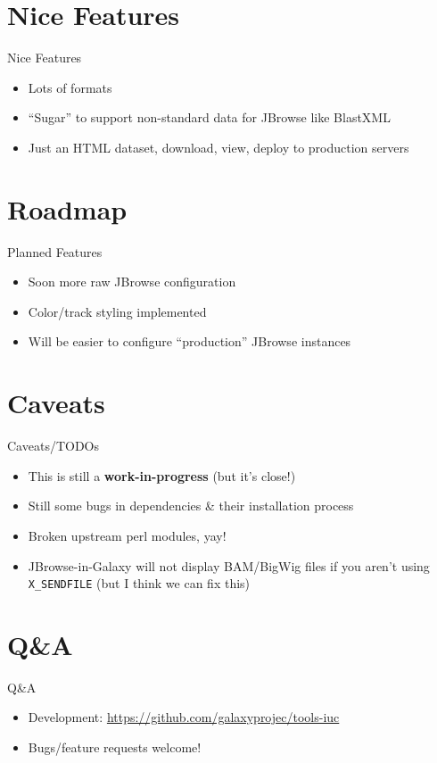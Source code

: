 \documentclass[12pt]{beamer} %
\begin{document}
\section{Nice Features}
\begin{frame}{Nice Features}
	\begin{itemize}
        \item Lots of formats
        \item ``Sugar'' to support non-standard data for JBrowse like BlastXML
        \item Just an HTML dataset, download, view, deploy to production servers
    \end{itemize}
\end{frame}

\section{Roadmap}
\begin{frame}{Planned Features}
	\begin{itemize}
        \item Soon more raw JBrowse configuration
        \item Color/track styling implemented
        \item Will be easier to configure ``production'' JBrowse instances
    \end{itemize}
\end{frame}

\section{Caveats}
\begin{frame}{Caveats/TODOs}
	\begin{itemize}
    	\item This is still a \textbf{work-in-progress} (but it's close!)
        \item Still some bugs in dependencies \& their installation process
        \item Broken upstream perl modules, yay! 
        \item JBrowse-in-Galaxy will not display BAM/BigWig files if you aren't using \texttt{X\_SENDFILE} (but I think we can fix this)
    \end{itemize}
\end{frame}



\section{Q\&A}
\begin{frame}{Q\&A}
	\begin{itemize}
    	\item Development: \url{https://github.com/galaxyprojec/tools-iuc}
        \item Bugs/feature requests welcome!
    \end{itemize}
\end{frame}
\end{document}

